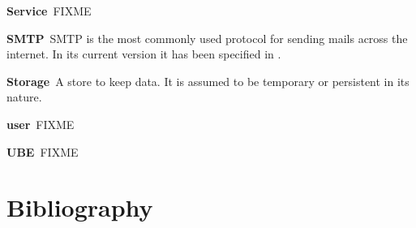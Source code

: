\documentclass[10pt,a4paper,appendixprefix,pdfusetitle,twocolumn,draft]{scrbook}
\newenvironment{entry}{\par\leavevmode\hangpara{1.5mm}{1}\ignorespaces}{\RaggedRight\par}
\newcommand*{\mainentry}[2]{{\bfseries{#1\label{def:#1}}}~#2\par}
\begin{document}
\begin{entry}
  \mainentry{Service}{FIXME}
\end{entry}

\begin{entry}
  \mainentry{SMTP}{SMTP is the most commonly used protocol for sending mails across the internet. In its current version it has been specified in \cite{RFC5321}.}
\end{entry}

\begin{entry}
  \mainentry{Storage}{A store to keep data. It is assumed to be temporary or persistent in its nature.}
\end{entry}

\begin{entry}
  \mainentry{user}{FIXME}
\end{entry}

\begin{entry}
  \mainentry{UBE}{FIXME}
\end{entry}

\chapter{Bibliography}
{
  \renewcommand*{\bibfont}{\small}
  \printbibliography[title={},heading=none]
}


\printindex

\begin{comment}


\end{comment}
\end{document}
